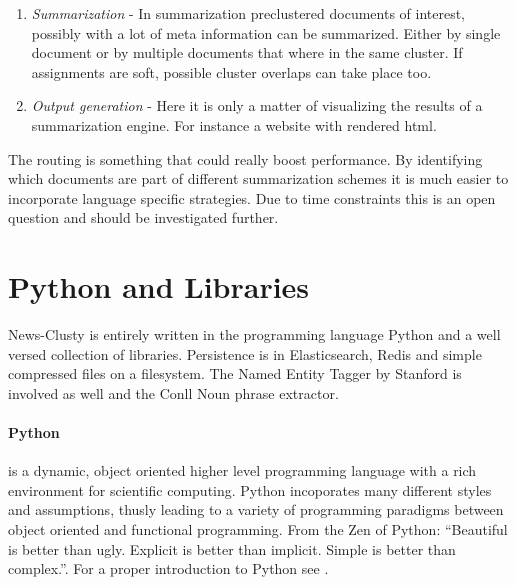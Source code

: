 \begin{enumerate}
    \item \emph{Summarization} - In summarization preclustered documents of interest, possibly with a lot of meta information can be summarized. Either by single document or by multiple documents that where in the same cluster. If assignments are soft, possible cluster overlaps can take place too. 

    \item \emph{Output generation} - Here it is only a matter of visualizing the results of a summarization engine. For instance a website with rendered html.
  \end{enumerate}

  The routing is something that could really boost performance. By identifying which documents are part of different summarization schemes it is much easier to incorporate language specific strategies. Due to time constraints this is an open question and should be investigated further.

\section{Python and Libraries}
  News-Clusty is entirely written in the programming language Python and a well versed collection of libraries. Persistence is in Elasticsearch, Redis and simple compressed files on a filesystem. The Named Entity Tagger by Stanford is involved as well and the Conll Noun phrase extractor. 

  \paragraph{Python} is a dynamic, object oriented higher level programming language with a rich environment for scientific computing. Python incoporates many different styles and assumptions, thusly leading to a variety of programming paradigms between object oriented and functional programming. From the Zen of Python: ``Beautiful is better than ugly. Explicit is better than implicit. Simple is better than complex.''. For a proper introduction to Python see \cite{NltkPython}.

